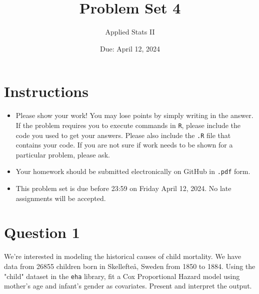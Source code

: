 \documentclass[12pt]{article} %
\title{Problem Set 4}
\date{Due: April 12, 2024}
\author{Applied Stats II}
\begin{document}
	\maketitle
	\section*{Instructions}
	\begin{itemize}
	\item Please show your work! You may lose points by simply writing in the answer. If the problem requires you to execute commands in \texttt{R}, please include the code you used to get your answers. Please also include the \texttt{.R} file that contains your code. If you are not sure if work needs to be shown for a particular problem, please ask.
	\item Your homework should be submitted electronically on GitHub in \texttt{.pdf} form.
	\item This problem set is due before 23:59 on Friday April 12, 2024. No late assignments will be accepted.

	\end{itemize}

	\vspace{.25cm}
\section*{Question 1}
\vspace{.25cm}
\noindent We're interested in modeling the historical causes of child mortality. We have data from 26855 children born in Skellefteå, Sweden from 1850 to 1884. Using the "child" dataset in the \texttt{eha} library, fit a Cox Proportional Hazard model using mother's age and infant's gender as covariates. Present and interpret the output.

 

\newpage
\end{document}
